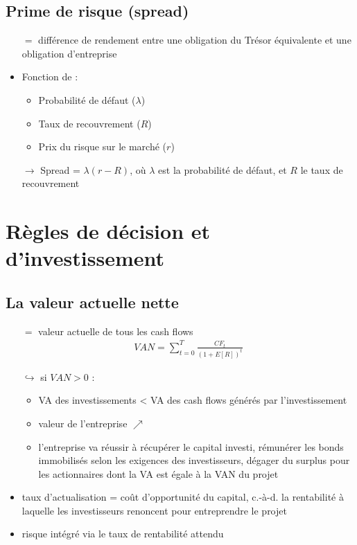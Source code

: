 \section{Prime de risque (spread)}

\begin{itemize}
    \item[$=$] différence de rendement entre une obligation du Trésor équivalente et une obligation d'entreprise
    \item Fonction de :
    \begin{itemize}
        \item Probabilité de défaut ($\lambda$)
        \item Taux de recouvrement ($R$)
        \item Prix du risque sur le marché ($r$)
    \end{itemize}
    \item[$\rightarrow$] Spread = $\lambda (r - R)$, où $\lambda$ est la probabilité de défaut, et $R$ le taux de recouvrement
\end{itemize}

\chapter{Règles de décision et d'investissement}

\section{La valeur actuelle nette}

\begin{itemize}
    \item[$=$] valeur actuelle de tous les cash flows
    \begin{align*}
        VAN = \sum_{t=0}^T \frac{CF_t}{(1 + E[R])^t}
    \end{align*}
    \item[$\hookrightarrow$] si $VAN > 0$ :
    \begin{itemize}
        \item VA des investissements < VA des cash flows générés par l'investissement
        \item valeur de l'entreprise $\nearrow$
        \item l'entreprise va réussir à récupérer le capital investi, rémunérer les bonds immobilisés selon les exigences des investisseurs, dégager du surplus pour les actionnaires dont la VA est égale à la VAN du projet
    \end{itemize}
    \item taux d'actualisation = coût d'opportunité du capital, c.-à-d. la rentabilité à laquelle les investisseurs renoncent pour entreprendre le projet
    \item risque intégré via le taux de rentabilité attendu
\end{itemize}

